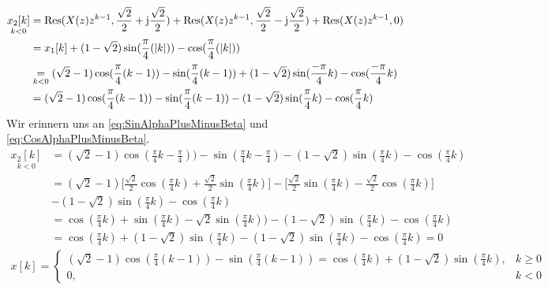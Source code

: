 \begin{align}
	\underset{k<0}{x_2[k]}&=\mathrm{Res}(X(z)z^{k-1},\frac{\sqrt{2}}{2}+\im\frac{\sqrt{2}}{2})+\mathrm{Res}(X(z)z^{k-1},\frac{\sqrt{2}}{2}-\im\frac{\sqrt{2}}{2})+\mathrm{Res}(X(z)z^{k-1},0)\nonumber\\
	&=x_1[k]+(1-\sqrt{2})\sin(\frac{\pi}{4}(|k|))-\cos(\frac{\pi}{4}(|k|))\nonumber \\
	&\underset{k<0}{=}(\sqrt{2}-1)\cos(\frac{\pi}{4}(k-1))-\sin(\frac{\pi}{4}(k-1))+(1-\sqrt{2})\sin(\frac{-\pi}{4}k)-\cos(\frac{-\pi}{4}k)\nonumber\\
	&=(\sqrt{2}-1)\cos(\frac{\pi}{4}(k-1))-\sin(\frac{\pi}{4}(k-1))-(1-\sqrt{2})\sin(\frac{\pi}{4}k)-\cos(\frac{\pi}{4}k)
\end{align}
Wir erinnern uns an \ref{eq:SinAlphaPlusMinusBeta} und \ref{eq:CosAlphaPlusMinusBeta}.
\begin{align}
	\underset{k<0}{x_2[k]}&=(\sqrt{2}-1)\cos(\frac{\pi}{4}k-\frac{\pi}{4}))-\sin(\frac{\pi}{4}k-\frac{\pi}{4})-(1-\sqrt{2})\sin(\frac{\pi}{4}k)-\cos(\frac{\pi}{4}k)\nonumber\\
	&=(\sqrt{2}-1)\bigg[\frac{\sqrt{2}}{2}\cos(\frac{\pi}{4}k)+\frac{\sqrt{2}}{2}\sin(\frac{\pi}{4}k)\bigg]-\bigg[\frac{\sqrt{2}}{2}\sin(\frac{\pi}{4}k)-\frac{\sqrt{2}}{2}\cos(\frac{\pi}{4}k)\bigg]\nonumber\\
	&-(1-\sqrt{2})\sin(\frac{\pi}{4}k)-\cos(\frac{\pi}{4}k)\nonumber\\
	&=\cos(\frac{\pi}{4}k)+\sin(\frac{\pi}{4}k)-\sqrt{2}\sin(\frac{\pi}{4}k))-(1-\sqrt{2})\sin(\frac{\pi}{4}k)-\cos(\frac{\pi}{4}k)\nonumber\\
	&=\cos(\frac{\pi}{4}k)+(1-\sqrt{2})\sin(\frac{\pi}{4}k)-(1-\sqrt{2})\sin(\frac{\pi}{4}k)-\cos(\frac{\pi}{4}k)=0
\end{align}
\begin{align}
	x[k]=\begin{cases}
		(\sqrt{2}-1)\cos(\frac{\pi}{4}(k-1))-\sin(\frac{\pi}{4}(k-1))=\cos(\frac{\pi}{4}k)+(1-\sqrt{2})\sin(\frac{\pi}{4}k), &k\geq0\\
		0, &k<0
	\end{cases}
\end{align}
